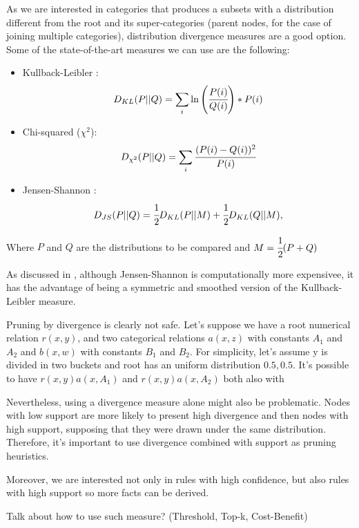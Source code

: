 As we are interested in categories that produces a subsets with a distribution different from the root and its super-categories (parent nodes, for the case of joining multiple categories), distribution divergence measures are a good option. Some of the state-of-the-art measures we can use are the following:

\begin{itemize}
 \item Kullback-Leibler \cite{Kullback51klDivergence}: 
    \begin{equation}
      D_{KL}(P||Q)=\sum_{\substack{i}}\ln\left(\cfrac{P(i)}{Q(i)}\right)*P(i)
    \end{equation}
 \item Chi-squared ($\chi^2$):
    \begin{equation}
      D_{\chi^2}(P||Q)=\sum_{\substack{i}}\cfrac{(P(i)-Q(i))^2}{P(i)}
    \end{equation}
 \item Jensen-Shannon \cite{17795}:
    \begin{equation}
      D_{JS}(P||Q)=\cfrac{1}{2}D_{KL}(P||M)+\cfrac{1}{2}D_{KL}(Q||M), 
    \end{equation}
\end{itemize}

Where $P$ and $Q$ are the distributions to be compared and $M=\cfrac{1}{2}(P+Q)$

As discussed in \cite{17795}, although Jensen-Shannon is computationally more expensivee, it has the advantage of being a symmetric and smoothed version of the Kullback-Leibler measure.

Pruning by divergence is clearly not safe. Let's suppose we have a root numerical relation $r(x,y)$, and two categorical relations $a(x,z)$ with constants $A_1$ and $A_2$ and $b(x,w)$ with constants $B_1$ and $B_2$. For simplicity, let's assume y is divided in two buckets and root has an uniform distribution ${0.5,0.5}$. It's possible to have $r(x,y)a(x,A_1)$ and $r(x,y)a(x,A_2)$ both also with 

Nevertheless, using a divergence measure alone might also be problematic. Nodes with low support are more likely to present high divergence and then nodes with high support, supposing that they were drawn under the same distribution. Therefore, it's important to use divergence combined with support as pruning heuristics.

Moreover, we are interested not only in rules with high confidence, but also rules with high support so more facts can be derived.

Talk about how to use such measure? (Threshold, Top-k, Cost-Benefit)




